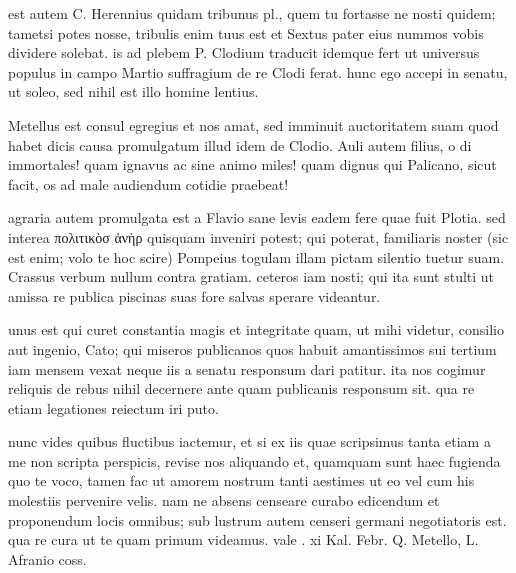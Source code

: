  est autem C. Herennius quidam tribunus pl., quem tu fortasse ne nosti quidem; tametsi potes nosse, tribulis enim tuus est et Sextus pater eius nummos vobis dividere solebat. is ad plebem P. Clodium traducit idemque fert ut universus populus in campo Martio suffragium de re Clodi ferat. hunc ego accepi in senatu, ut soleo, sed nihil est illo homine lentius.

 Metellus est consul egregius et nos amat, sed imminuit auctoritatem suam quod habet dicis causa promulgatum illud idem de Clodio. Auli autem filius, o di immortales! quam ignavus ac sine animo miles! quam dignus qui Palicano, sicut facit, os ad male audiendum cotidie praebeat!

 agraria autem promulgata est a Flavio sane levis eadem fere quae fuit Plotia. sed interea πολιτικὸσ ἀνὴρ quisquam inveniri potest; qui poterat, familiaris noster (sic est enim; volo te hoc scire) Pompeius togulam illam pictam silentio tuetur suam. Crassus verbum nullum contra gratiam. ceteros iam nosti; qui ita sunt stulti ut amissa re publica piscinas suas fore salvas sperare videantur.

 unus est qui curet constantia magis et integritate quam, ut mihi videtur, consilio aut ingenio, Cato; qui miseros publicanos quos habuit amantissimos sui tertium iam mensem vexat neque iis a senatu responsum dari patitur. ita nos cogimur reliquis de rebus nihil decernere ante quam publicanis responsum sit. qua re etiam legationes reiectum iri puto.

 nunc vides quibus fluctibus iactemur, et si ex iis quae scripsimus tanta etiam a me non scripta perspicis, revise nos aliquando et, quamquam sunt haec fugienda quo te voco, tamen fac ut amorem nostrum tanti aestimes ut eo vel cum his molestiis pervenire velis. nam ne absens censeare curabo edicendum et proponendum locis omnibus; sub lustrum autem censeri germani negotiatoris est. qua re cura ut te quam primum videamus. vale . xi Kal. Febr. Q. Metello, L. Afranio coss.
